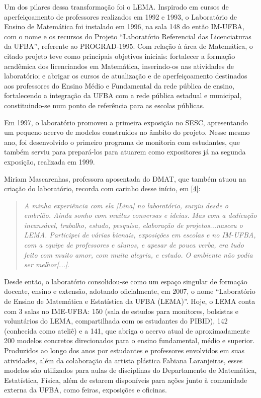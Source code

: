 \documentclass{hipatia}
\begin{document}
Um dos pilares dessa transformação foi o LEMA. Inspirado em cursos de aperfeiçoamento de professores realizados em 1992 e 1993, o Laboratório de Ensino de Matemática foi instalado em 1996, na sala 148 do  então IM-UFBA, com o nome e os recursos do Projeto “Laboratório Referencial das Licenciaturas da UFBA”, referente ao PROGRAD-1995. Com relação à área de Matemática, o citado projeto teve como principais objetivos iniciais: fortalecer a formação acadêmica dos licenciandos em Matemática, inserindo-os nas atividades de laboratório; e 
abrigar os cursos de atualização e de aperfeiçoamento destinados aos professores do Ensino Médio e Fundamental da rede pública de ensino, fortalecendo a integração da UFBA com a rede pública estadual e municipal, constituindo-se num ponto de referência para as escolas públicas. 

Em 1997, o laboratório promoveu a primeira exposição no SESC, apresentando um pequeno acervo de modelos construídos no âmbito do projeto. Nesse mesmo ano, foi desenvolvido o primeiro programa de monitoria com estudantes, que também serviu para prepará-los para atuarem como expositores já na segunda exposição, realizada em 1999. 

Miriam Mascarenhas, professora aposentada do DMAT, que também atuou na criação do laboratório, recorda com carinho desse início, em \href{https://youtu.be/-kerHGWxOvk}{[4]}: \begin{quote}\textit{A minha experiência com ela [Lina] no laboratório, surgiu desde o embrião. Ainda sonho com muitas conversas e ideias. Mas com a dedicação incansável, trabalho, estudo, pesquisa, elaboração de projetos...nasceu o LEMA. Participei de várias bienais, exposições em escolas e no IM-UFBA, com a equipe de
professores e alunos, e apesar de pouca verba, era tudo feito com muito amor, com muita alegria, e estudo. O ambiente não podia ser melhor[...]}. \end{quote}

Desde então, o laboratório consolidou-se como um espaço singular de formação docente, ensino e extensão, adotando oficialmente, em 2007, o nome “Laboratório de Ensino de Matemática e Estatística da UFBA (LEMA)”. Hoje, o LEMA conta com 3 salas no IME-UFBA: 150 (sala de estudos para monitores, bolsistas e voluntários do LEMA, compartilhada com os estudantes do PIBID), 142 (conhecida como ateliê) e a 141, que abriga o acervo atual de aproximadamente 200 modelos concretos direcionados para o ensino fundamental, médio e superior. Produzidos ao longo dos anos por estudantes e professores envolvidos em suas atividades, além da colaboração da artista plástica Fabiana Laranjeiras, esses modelos são utilizados para aulas de disciplinas do Departamento de Matemática, Estatística, Física, além de estarem disponíveis para ações junto à comunidade externa da UFBA, como feiras, exposições e oficinas.  
\end{document}
